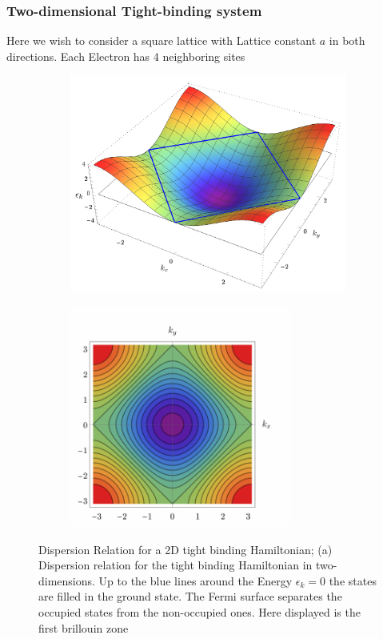 \documentclass[11pt, a4paper]{article}
\theoremstyle{definition} %
\begin{document}
	\subsubsection{Two-dimensional Tight-binding system}
	Here we wish to consider a square lattice with Lattice constant $a$ in both directions. Each Electron has 4 neighboring sites
	
	\begin{figure}[h]
		\centering
		\begin{subfigure}[t]{0.49\textwidth}
		\centering
			\includegraphics[width =\textwidth]{Dispersion_relation2d}
			\caption{}
		\end{subfigure}
		\begin{subfigure}[t]{0.49\textwidth}
		\centering
			\includegraphics[width =0.8\textwidth]{Dispersion_Relation2d_Top}
			\caption{}
		\end{subfigure}
		\caption{Dispersion Relation for a 2D tight binding Hamiltonian; (a) Dispersion relation for the tight binding Hamiltonian in two-dimensions. Up to the blue lines around the Energy $\epsilon_k = 0$ the states are filled in the ground state. The Fermi surface separates the occupied states from the non-occupied ones. Here displayed is the first brillouin zone}
	\end{figure}
	
\end{document}
